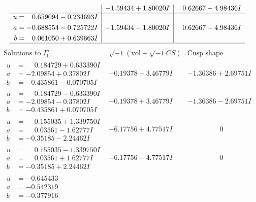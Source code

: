 \documentclass[1p]{elsarticle_modified}
\theoremstyle{definition}
\newcommand{\I}{\sqrt{-1}}
\begin{document}
$$\begin{array}{c|c|c}
 & -1.59434 + 1.80020 I & \phantom{-}0.62667 - 4.98436 I \\ \hline\begin{aligned}
u &= \phantom{-}0.659094 - 0.234693 I \\
a &= -0.688554 - 0.725722 I \\
b &= \phantom{-}0.061050 + 0.639663 I\end{aligned}
 & -1.59434 - 1.80020 I & \phantom{-}0.62667 + 4.98436 I\\
 \hline 
 \end{array}$$\newpage$$\begin{array}{c|c|c}  
\text{Solutions to }I^u_{1}& \I (\text{vol} + \sqrt{-1}CS) & \text{Cusp shape}\\
 \hline 
\begin{aligned}
u &= \phantom{-}0.184729 + 0.633390 I \\
a &= -2.09854 + 0.37802 I \\
b &= -0.435861 - 0.070705 I\end{aligned}
 & -0.19378 - 3.46779 I & -1.36386 + 2.69751 I \\ \hline\begin{aligned}
u &= \phantom{-}0.184729 - 0.633390 I \\
a &= -2.09854 - 0.37802 I \\
b &= -0.435861 + 0.070705 I\end{aligned}
 & -0.19378 + 3.46779 I & -1.36386 - 2.69751 I \\ \hline\begin{aligned}
u &= \phantom{-}0.155035 + 1.339750 I \\
a &= \phantom{-}0.03561 - 1.62777 I \\
b &= -0.35185 - 2.24462 I\end{aligned}
 & -6.17756 + 4.77517 I & \phantom{-0.000000 } 0 \\ \hline\begin{aligned}
u &= \phantom{-}0.155035 - 1.339750 I \\
a &= \phantom{-}0.03561 + 1.62777 I \\
b &= -0.35185 + 2.24462 I\end{aligned}
 & -6.17756 - 4.77517 I & \phantom{-0.000000 } 0 \\ \hline\begin{aligned}
u &= -0.645433\phantom{ +0.000000I} \\
a &= -0.542319\phantom{ +0.000000I} \\
b &= -0.377916\phantom{ +0.000000I}\end{aligned}

\end{array}$$
\end{document}
